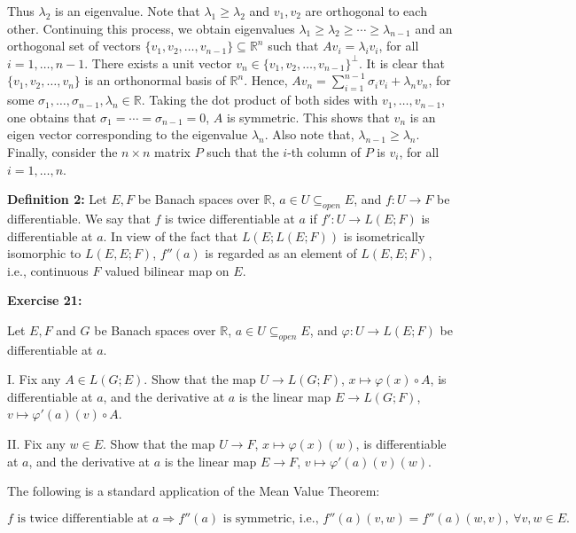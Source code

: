 \documentclass{book}
\begin{document}
Thus $\lambda_2$ is an eigenvalue. Note that $\lambda_1 \geq \lambda_2$ and $v_1, v_2$ are orthogonal to each other. Continuing this process, we obtain eigenvalues $\lambda_1 \geq \lambda_2 \geq \cdots \geq \lambda_{n-1}$ and an orthogonal set of vectors $\{v_1, v_2, \ldots, v_{n-1}\} \subseteq \mathbb{R}^n$ such that $Av_i = \lambda_i v_i$, for all $i = 1, \ldots, n-1$. There exists a unit vector $v_n \in \{v_1, v_2, \ldots, v_{n-1}\}^\perp$. It is clear that $\{v_1, v_2, \ldots, v_n\}$ is an orthonormal basis of $\mathbb{R}^n$. Hence, $Av_n = \sum_{i=1}^{n-1} \sigma_i v_i + \lambda_n v_n$, for some $\sigma_1, \ldots, \sigma_{n-1}, \lambda_n \in \mathbb{R}$. Taking the dot product of both sides with $v_1, \ldots, v_{n-1}$, one obtains that $\sigma_1 = \cdots = \sigma_{n-1} = 0$, $A$ is symmetric. This shows that $v_n$ is an eigen vector corresponding to the eigenvalue $\lambda_n$. Also note that, $\lambda_{n-1} \geq \lambda_n$. Finally, consider the $n \times n$ matrix $P$ such that the $i$-th column of $P$ is $v_i$, for all $i = 1, \ldots, n$.

\textbf{Definition 2:} Let $E, F$ be Banach spaces over $\mathbb{R}$, $a \in U \subseteq_{open} E$, and $f : U \to F$ be differentiable. We say that $f$ is twice differentiable at $a$ if $f' : U \to L(E; F)$ is differentiable at $a$. In view of the fact that $L(E; L(E; F))$ is isometrically isomorphic to $L(E, E; F)$, $f''(a)$ is regarded as an element of $L(E, E; F)$, i.e., continuous $F$ valued bilinear map on $E$.

\textbf{Exercise 21:}

Let $E, F$ and $G$ be Banach spaces over $\mathbb{R}$, $a \in U \subseteq_{open} E$, and $\varphi : U \to L(E; F)$ be differentiable at $a$.

I. Fix any $A \in L(G; E)$. Show that the map $U \to L(G; F)$, $x \mapsto \varphi(x) \circ A$, is differentiable at $a$, and the derivative at $a$ is the linear map $E \to L(G; F)$, $v \mapsto \varphi'(a)(v) \circ A$.

II. Fix any $w \in E$. Show that the map $U \to F$, $x \mapsto \varphi(x)(w)$, is differentiable at $a$, and the derivative at $a$ is the linear map $E \to F$, $v \mapsto \varphi'(a)(v)(w)$.

The following is a standard application of the Mean Value Theorem:

\[
f \text{ is twice differentiable at } a \Longrightarrow f''(a) \text{ is symmetric, i.e., } f''(a)(v, w) = f''(a)(w, v), \ \forall v, w \in E.
\tag{14}
\]
\end{document}
